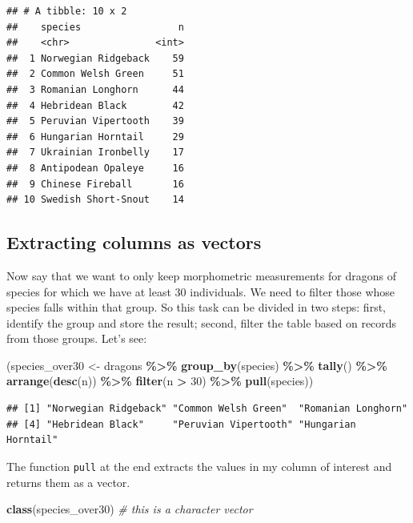 \documentclass[
]{book}
\newenvironment{Shaded}{\begin{snugshade}}{\end{snugshade}}
\newcommand{\CommentTok}[1]{\textcolor[rgb]{0.56,0.35,0.01}{\textit{#1}}}
\newcommand{\DecValTok}[1]{\textcolor[rgb]{0.00,0.00,0.81}{#1}}
\newcommand{\FunctionTok}[1]{\textcolor[rgb]{0.13,0.29,0.53}{\textbf{#1}}}
\newcommand{\NormalTok}[1]{#1}
\newcommand{\OtherTok}[1]{\textcolor[rgb]{0.56,0.35,0.01}{#1}}
\newcommand{\SpecialCharTok}[1]{\textcolor[rgb]{0.81,0.36,0.00}{\textbf{#1}}}
\begin{document}
\begin{verbatim}
## # A tibble: 10 x 2
##    species                 n
##    <chr>               <int>
##  1 Norwegian Ridgeback    59
##  2 Common Welsh Green     51
##  3 Romanian Longhorn      44
##  4 Hebridean Black        42
##  5 Peruvian Vipertooth    39
##  6 Hungarian Horntail     29
##  7 Ukrainian Ironbelly    17
##  8 Antipodean Opaleye     16
##  9 Chinese Fireball       16
## 10 Swedish Short-Snout    14
\end{verbatim}

\hypertarget{extracting-columns-as-vectors}{%
\subsection{Extracting columns as vectors}\label{extracting-columns-as-vectors}}

Now say that we want to only keep morphometric measurements for dragons of
species for which we have at least 30 individuals. We need to filter those whose
species falls within that group. So this task can be divided in two steps:
first, identify the group and store the result; second, filter the table based
on records from those groups. Let's see:

\begin{Shaded}
\begin{Highlighting}[]
\NormalTok{(species\_over30 }\OtherTok{\textless{}{-}}\NormalTok{ dragons }\SpecialCharTok{\%\textgreater{}\%} 
   \FunctionTok{group\_by}\NormalTok{(species) }\SpecialCharTok{\%\textgreater{}\%}
   \FunctionTok{tally}\NormalTok{() }\SpecialCharTok{\%\textgreater{}\%} 
   \FunctionTok{arrange}\NormalTok{(}\FunctionTok{desc}\NormalTok{(n)) }\SpecialCharTok{\%\textgreater{}\%} 
   \FunctionTok{filter}\NormalTok{(n }\SpecialCharTok{\textgreater{}} \DecValTok{30}\NormalTok{) }\SpecialCharTok{\%\textgreater{}\%} 
   \FunctionTok{pull}\NormalTok{(species))}
\end{Highlighting}
\end{Shaded}

\begin{verbatim}
## [1] "Norwegian Ridgeback" "Common Welsh Green"  "Romanian Longhorn"  
## [4] "Hebridean Black"     "Peruvian Vipertooth" "Hungarian Horntail"
\end{verbatim}

The function \texttt{pull} at the end extracts the values in my column of interest and
returns them as a vector.

\begin{Shaded}
\begin{Highlighting}[]
\FunctionTok{class}\NormalTok{(species\_over30) }\CommentTok{\# this is a character vector}
\end{Highlighting}
\end{Shaded}
\end{document}
